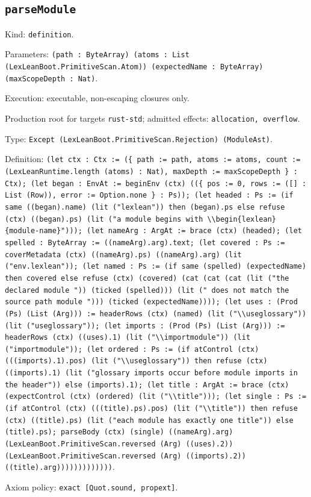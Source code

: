 \documentclass[11pt]{article}
\begin{document}
\subsection*{\texttt{parseModule}}
\noindent Kind: \texttt{definition}.\par
\noindent Parameters: \texttt{(path : ByteArray) (atoms : List (LexLeanBoot.PrimitiveScan.Atom)) (expectedName : ByteArray) (maxScopeDepth : Nat)}.\par
\noindent Execution: executable, non-escaping closures only.\par
\noindent Production root for targets \texttt{rust-std}; admitted effects: \texttt{allocation, overflow}.\par
\noindent Type: \texttt{Except (LexLeanBoot.PrimitiveScan.Rejection) (ModuleAst)}.\par
\noindent Definition: \texttt{(let ctx : Ctx := (\{ path := path, atoms := atoms, count := (LexLeanRuntime.length (atoms) : Nat), maxDepth := maxScopeDepth \} : Ctx); (let began : EnvAt := beginEnv (ctx) ((\{ pos := 0, rows := ([] : List (Row)), error := Option.none \} : Ps)); (let headed : Ps := (if same ((began).name) (lit ("lexlean")) then (began).ps else refuse (ctx) ((began).ps) (lit ("a module begins with \textbackslash{}\textbackslash{}begin\{lexlean\}\{module-name\}"))); (let nameArg : ArgAt := brace (ctx) (headed); (let spelled : ByteArray := ((nameArg).arg).text; (let covered : Ps := coverMetadata (ctx) ((nameArg).ps) ((nameArg).arg) (lit ("env.lexlean")); (let named : Ps := (if same (spelled) (expectedName) then covered else refuse (ctx) (covered) (cat (cat (cat (lit ("the declared module ")) (ticked (spelled))) (lit (" does not match the source path module "))) (ticked (expectedName)))); (let uses : (Prod (Ps) (List (Arg))) := headerRows (ctx) (named) (lit ("\textbackslash{}\textbackslash{}useglossary")) (lit ("useglossary")); (let imports : (Prod (Ps) (List (Arg))) := headerRows (ctx) ((uses).1) (lit ("\textbackslash{}\textbackslash{}importmodule")) (lit ("importmodule")); (let ordered : Ps := (if atControl (ctx) (((imports).1).pos) (lit ("\textbackslash{}\textbackslash{}useglossary")) then refuse (ctx) ((imports).1) (lit ("glossary imports occur before module imports in the header")) else (imports).1); (let title : ArgAt := brace (ctx) (expectControl (ctx) (ordered) (lit ("\textbackslash{}\textbackslash{}title"))); (let single : Ps := (if atControl (ctx) (((title).ps).pos) (lit ("\textbackslash{}\textbackslash{}title")) then refuse (ctx) ((title).ps) (lit ("each module has exactly one title")) else (title).ps); parseBody (ctx) (single) ((nameArg).arg) (LexLeanBoot.PrimitiveScan.reversed (Arg) ((uses).2)) (LexLeanBoot.PrimitiveScan.reversed (Arg) ((imports).2)) ((title).arg)))))))))))))}.\par
\noindent Axiom policy: \texttt{exact [Quot.sound, propext]}.\par
\end{document}
